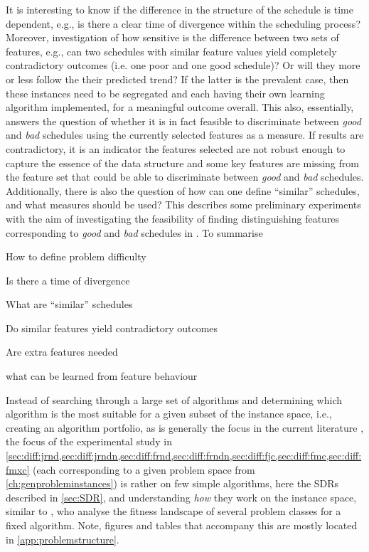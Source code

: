 It is interesting to know if the difference in the structure of the schedule is time dependent, e.g.,  is there a clear time of divergence within the scheduling process? 
Moreover, investigation of how sensitive is the difference between two sets of features, e.g.,  can two schedules with similar feature values yield completely contradictory outcomes (i.e. one poor and one good schedule)? Or will they more or less follow the their predicted trend? If the latter is the prevalent case, then these instances need to be segregated and each having their own learning algorithm implemented, for a meaningful outcome overall.  
This also, essentially, answers the question of whether  it is in fact feasible to discriminate between \emph{good} and \emph{bad} schedules using the currently selected features as a measure. If results are contradictory, it is an indicator the features selected are not robust enough to capture the essence of the data structure and some key features are missing from the feature set that could be able to discriminate between \emph{good} and \emph{bad} schedules. 
Additionally, there is also the question of how can one define ``similar'' 
schedules, and what measures should be used? This 
 describes some preliminary experiments with 
the aim of investigating the feasibility of finding distinguishing features 
corresponding to \emph{good} and \emph{bad} schedules in \jsp. To summarise
\begin{enumerate*}[itemjoin={{? }}, itemjoin*={{? And }}, after={{? }}]
	\item How to define problem difficulty
	\item Is there a time of divergence
	\item What are ``similar'' schedules
	\item Do similar features yield contradictory outcomes
	\item Are extra features needed
	\item what can be learned from feature behaviour
\end{enumerate*}

Instead of searching through a large set of algorithms  and determining which algorithm is the most suitable for a given subset of the instance space, i.e., creating an algorithm portfolio, as is generally the focus in the current literature \citep{SmithMilesLion3,SmithMilesLion5,Corne10}, the focus of the experimental study in \cref{sec:diff:jrnd,sec:diff:jrndn,sec:diff:frnd,sec:diff:frndn,sec:diff:fjc,sec:diff:fmc,sec:diff:fmxc} 
(each corresponding to a given problem space from \cref{ch:genprobleminstances})
is rather on few simple algorithms, here the SDRs described in \cref{sec:SDR}, and understanding \emph{how} they work on the instance space, similar to \citet{Whitley}, who analyse the fitness landscape of several problem classes for a fixed algorithm. 
Note, figures and tables that accompany this  are mostly located in \cref{app:problemstructure}.


